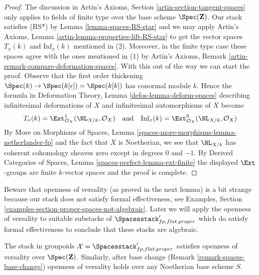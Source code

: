 \begin{proof}
The discussion in Artin's Axioms, Section \ref{artin-section-tangent-spaces}
only applies to fields of finite type over the base scheme $\Spec(\mathbf{Z})$.
Our stack satisfies (RS*) by Lemma \ref{lemma-spaces-RS-star}
and we may apply
Artin's Axioms, Lemma \ref{artin-lemma-properties-lift-RS-star}
to get the vector spaces $T_x(k)$ and $\text{Inf}_x(k)$
mentioned in (2). Moreover, in the finite type case these spaces agree with the
ones mentioned in (1)
by Artin's Axioms, Remark \ref{artin-remark-compare-deformation-spaces}.
With this out of the way we can start the proof.
Observe that the first order thickening
$\Spec(k) \to \Spec(k[\epsilon]) = \Spec(k[k])$
has conormal module $k$. Hence the formula in
Deformation Theory, Lemma \ref{defos-lemma-deform-spaces}
describing infinitesimal deformations of $X$ and infinitesimal
automorphisms of $X$ become
$$
T_x(k) = \Ext^1_{\mathcal{O}_X}(\NL_{X/k}, \mathcal{O}_X)
\quad\text{and}\quad
\text{Inf}_x(k) = \Ext^0_{\mathcal{O}_X}(\NL_{X/k}, \mathcal{O}_X)
$$
By More on Morphisms of Spaces, Lemma
\ref{spaces-more-morphisms-lemma-netherlander-fp}
and the fact that $X$ is Noetherian, we see that
$\NL_{X/k}$ has coherent cohomology sheaves zero except
in degrees $0$ and $-1$.
By Derived Categories of Spaces, Lemma \ref{spaces-perfect-lemma-ext-finite}
the displayed $\Ext$-groups are finite $k$-vector spaces
and the proof is complete.
\end{proof}

\noindent
Beware that openness of versality (as proved in the next lemma)
is a bit strange because our stack does not satisfy formal effectiveness, see
Examples, Section \ref{examples-section-proper-spaces-not-algebraic}.
Later we will apply the openness of versality to suitable substacks of
$\Spacesstack'_{fp, flat, proper}$ which do satisfy
formal effectiveness to conclude that these stacks are algebraic.

\begin{lemma}
\label{lemma-spaces-defo-thy}
The stack in groupoids $\mathcal{X} = \Spacesstack'_{fp, flat, proper}$
satisfies openness of versality over $\Spec(\mathbf{Z})$.
Similarly, after base change (Remark \ref{remark-spaces-base-change})
openness of versality holds over any Noetherian base scheme $S$.
\end{lemma}

